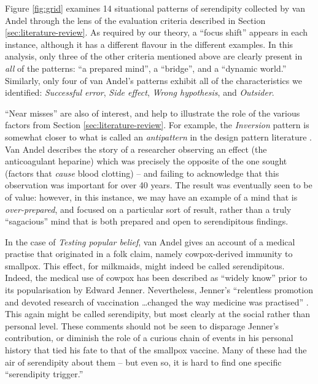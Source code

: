 \documentclass{llncs}
\begin{document}
Figure \ref{fig:grid} examines 14 situational patterns of serendipity
collected by van Andel \cite{van1994anatomy} through the lens of the evaluation
criteria described in Section \ref{sec:literature-review}.
%
As required by our theory, a ``focus shift'' appears in each instance,
although it has a different flavour in the different examples.  In
this analysis, only three of the other criteria mentioned above are
clearly present in \emph{all} of the patterns: ``a prepared mind'', a
``bridge'', and a ``dynamic world.''  Similarly, only four of van
Andel's patterns exhibit all of the characteristics we identified:
\emph{Successful error}, \emph{Side effect}, \emph{Wrong hypothesis},
and \emph{Outsider}.

``Near misses'' are also of interest, and help to illustrate the role
of the various factors from Section \ref{sec:literature-review}.
%
For example, the \emph{Inversion} pattern is somewhat closer to what is called an \emph{antipattern} in the design pattern literature \cite{brown1998antipatterns}.  Van Andel describes the story of a researcher observing an effect (the anticoagulant heparine) which was precisely the opposite of the one sought (factors that \emph{cause} blood clotting) -- and failing to acknowledge that this observation was important for over 40 years.  The result was eventually seen to be of value: however, in this instance, we may have an example of a mind that is \emph{over-prepared}, and focused on a particular sort of result, rather than a truly ``sagacious'' mind that is both prepared and open to serendipitous findings.

In the case of \emph{Testing popular belief}, van Andel gives an
account of a medical practise that originated in a folk claim, namely
cowpox-derived immunity to smallpox.  This effect, for milkmaids,
might indeed be called serendipitous.  Indeed, the medical use of
cowpox has been described as ``widely know'' \cite{riedel2005edward}
prior to its popularisation by Edward Jenner.  Nevertheless, 
Jenner's ``relentless promotion and devoted research of vaccination
\ldots changed the way medicine was practised'' \cite{riedel2005edward}.
This again might be called serendipity, but most clearly at the social
rather than personal level.  These comments should not be seen to
disparage Jenner's contribution, or diminish the role of a curious
chain of events in his personal history that tied his fate to that of
the smallpox vaccine.  Many of these had the air of serendipity about
them -- but even so, it is hard to find one specific ``serendipity
trigger.''
 
\end{document}
